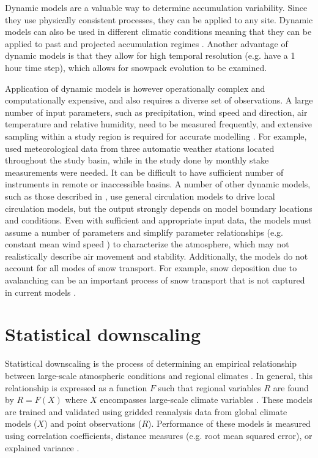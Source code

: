 \documentclass{sfuthesis}
\begin{document}
{\begin{appendices}
Dynamic models are a valuable way to determine accumulation variability. Since they use physically consistent processes, they can be applied to any site. Dynamic models can also be used in different climatic conditions meaning that they can be applied to past and projected accumulation regimes \citep{Clark2011}. Another advantage of dynamic models is that they allow for high temporal resolution (e.g. \cite{Mott2008} have a 1 hour time step), which allows for snowpack evolution to be examined.

Application of dynamic models is however operationally complex and computationally expensive, and also requires a diverse set of observations. A large number of input parameters, such as precipitation, wind speed and direction, air temperature and relative humidity, need to be measured frequently, and extensive sampling within a study region is required for accurate modelling \citep{Liston2006}. For example, \cite{Dadic2010} used meteorological data from three automatic weather stations located throughout the study basin, while in the study done by \cite{Mott2008} monthly stake measurements were needed. It can be difficult to have sufficient number of instruments in remote or inaccessible basins. A number of other dynamic models, such as those described in \cite{Fowler2007}, use general circulation models to drive local circulation models, but the output strongly depends on model boundary locations and conditions.  Even with sufficient and appropriate input data, the models must assume a number of parameters and simplify parameter relationships (e.g. constant mean wind speed \citep{Mott2008}) to characterize the atmosphere, which may not realistically describe air movement and stability. Additionally, the models do not account for all modes of snow transport. For example, snow deposition due to avalanching can be an important process of snow transport that is not captured in current models \citep{Mott2008}. 

\section{Statistical downscaling}

Statistical downscaling is the process of determining an empirical relationship between large-scale atmospheric conditions and regional climates \citep{Fowler2007}. In general, this relationship is expressed as a function $F$ such that regional variables $R$ are found by $R=F(X)$ where $X$ encompasses large-scale climate variables \citep{Fowler2007}. These models are trained and validated using gridded reanalysis data from global climate models ($X$) and point observations ($R$). Performance of these models is measured using correlation coefficients, distance measures (e.g. root mean squared error), or explained variance \citep{Fowler2007}. 


\end{appendices}}
\end{document}
